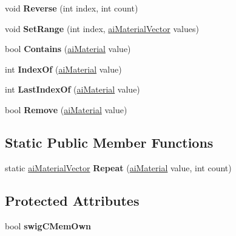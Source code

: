 \begin{DoxyCompactItemize}
\item 
\hypertarget{classai_material_vector_aada91359947123e1f1a299a121c84e3c}{void {\bfseries Reverse} (int index, int count)}\label{classai_material_vector_aada91359947123e1f1a299a121c84e3c}

\item 
\hypertarget{classai_material_vector_af6882d16d79230f9858f8f049f8ce94b}{void {\bfseries Set\+Range} (int index, \hyperlink{classai_material_vector}{ai\+Material\+Vector} values)}\label{classai_material_vector_af6882d16d79230f9858f8f049f8ce94b}

\item 
\hypertarget{classai_material_vector_a3a30541699b45fbbcdfbe14945adaab8}{bool {\bfseries Contains} (\hyperlink{classai_material}{ai\+Material} value)}\label{classai_material_vector_a3a30541699b45fbbcdfbe14945adaab8}

\item 
\hypertarget{classai_material_vector_a9fd7027fc5061ed78e732efdb27efd52}{int {\bfseries Index\+Of} (\hyperlink{classai_material}{ai\+Material} value)}\label{classai_material_vector_a9fd7027fc5061ed78e732efdb27efd52}

\item 
\hypertarget{classai_material_vector_a1198a264a3054c53a0b5e8cd3a59d644}{int {\bfseries Last\+Index\+Of} (\hyperlink{classai_material}{ai\+Material} value)}\label{classai_material_vector_a1198a264a3054c53a0b5e8cd3a59d644}

\item 
\hypertarget{classai_material_vector_a55e8dc18a2291064f7200921f40644e7}{bool {\bfseries Remove} (\hyperlink{classai_material}{ai\+Material} value)}\label{classai_material_vector_a55e8dc18a2291064f7200921f40644e7}

\end{DoxyCompactItemize}
\subsection*{Static Public Member Functions}
\begin{DoxyCompactItemize}
\item 
\hypertarget{classai_material_vector_ae538788eaf0a5e8af748180eb76596da}{static \hyperlink{classai_material_vector}{ai\+Material\+Vector} {\bfseries Repeat} (\hyperlink{classai_material}{ai\+Material} value, int count)}\label{classai_material_vector_ae538788eaf0a5e8af748180eb76596da}

\end{DoxyCompactItemize}
\subsection*{Protected Attributes}
\begin{DoxyCompactItemize}
\item 
\hypertarget{classai_material_vector_afe6ee86e04721723714f9cd0db0fa567}{bool {\bfseries swig\+C\+Mem\+Own}}\label{classai_material_vector_afe6ee86e04721723714f9cd0db0fa567}

\end{DoxyCompactItemize}

